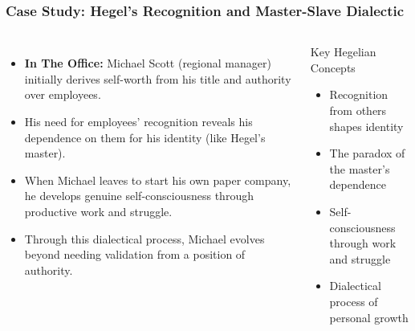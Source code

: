 \documentclass{beamer}
\begin{document}
\begin{frame}
    \frametitle{Case Study: Hegel's Recognition and Master-Slave Dialectic}
    \begin{columns}
    \begin{itemize}
        \item \textbf{In The Office:} Michael Scott (regional manager) initially derives self-worth from his title and authority over employees.
        \item His need for employees' recognition reveals his dependence on them for his identity (like Hegel's master).
        \item When Michael leaves to start his own paper company, he develops genuine self-consciousness through productive work and struggle.
        \item Through this dialectical process, Michael evolves beyond needing validation from a position of authority.
    \end{itemize}
    
    \begin{alertblock}{Key Hegelian Concepts}
    \begin{itemize}
        \item Recognition from others shapes identity
        \item The paradox of the master's dependence
        \item Self-consciousness through work and struggle
        \item Dialectical process of personal growth
    \end{itemize}
    \end{alertblock}
    \end{columns}
    \end{frame}
\end{document}
